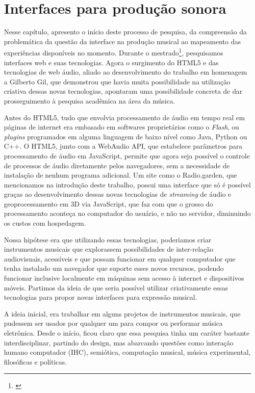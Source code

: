 \chapter{Interfaces para produção sonora}
\label{ch:pesquisa}
Nesse capítulo, apresento o início deste processo de pesquisa, da compreensão da problemática da questão da interface na produção musical ao mapeamento das experiências disponíveis no momento. Durante o mestrado\footnote{\cite{Stolfi}}, pesquisamos interfaces web e suas tecnologias. Agora o surgimento do HTML5 e das tecnologias de web áudio, aliado ao desenvolvimento do trabalho em homenagem a Gilberto Gil, que demonstrou que havia muita possibilidade na utilização criativa dessas novas tecnologias, apontaram uma possibilidade concreta de dar prosseguimento à pesquisa acadêmica na área da música.

Antes do HTML5, tudo que envolvia processamento de áudio em tempo real em páginas de internet era embasado em softwares proprietários como o \emph{Flash}, ou \emph{plugins} programados em alguma linguagem de baixo nível como Java, Python ou C++. O HTML5, junto com a WebAudio API, que estabelece parâmetros para processamento de áudio em JavaScript, permite que agora seja possível o controle de processos de áudio diretamente pelos navegadores, sem a necessidade de instalação de nenhum programa adicional. Um site como o Radio.garden, que mencionamos na introdução deste trabalho, possui uma interface que só é possível graças ao desenvolvimento dessas novas tecnologias de \emph{streaming} de áudio e geoprocessamento em 3D via JavaScript, que faz com que o grosso do processamento aconteça no computador do usuário, e não no servidor, diminuindo os custos com hospedagem.

Nossa hipótese era que utilizando essas tecnologias, poderíamos criar instrumentos musicais que explorassem possibilidades de inter-relação audiovisuais, acessíveis e que possam funcionar em qualquer computador que tenha instalado um navegador que suporte esses novos recursos, podendo funcionar inclusive localmente em máquinas sem acesso à internet e dispositivos móveis. Partimos da ideia de que seria possível utilizar criativamente essas tecnologias para propor novas interfaces para expressão musical.
    
A ideia inicial, era trabalhar em alguns projetos de instrumentos musicais, que pudessem ser usados por qualquer um para compor ou performar música eletrônica. Desde o início, ficou claro que essa pesquisa tinha um caráter bastante interdisciplinar, partindo do design, mas abarcando questões como interação humano computador (IHC), semiótica, computação musical, música experimental, filosóficas e políticas.


